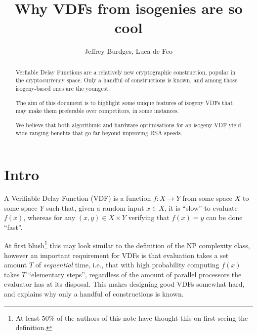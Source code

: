 \documentclass{article}
\title{Why VDFs from isogenies are so cool}
\author{Jeffrey Burdges, Luca de Feo}
\date{}
\begin{document}
\maketitle

\begin{abstract}
  Verfiable Delay Functions are a relatively new cryptographic
  construction, popular in the cryptocurrency space. Only a handful of
  constructions is known, and among those isogeny-based ones are the
  youngest.

  The aim of this document is to highlight some unique features of
  isogeny VDFs that may make them preferable over competitors, in some
  instances.

  We believe that both algorithmic and hardware optimisations for an
  isogeny VDF yield wide ranging benefits that go far beyond improving
  RSA speeds.
\end{abstract}


\section{Intro}

A Verifiable Delay Function (VDF) is a function $f: X → Y$ from some
space $X$ to some space $Y$ such that, given a random input $x ∈ X$,
it is ``slow'' to evaluate $f(x)$, whereas for any $(x,y) ∈ X×Y$
verifying that $f(x) = y$ can be done ``fast''.

At first blush\footnote{At least 50\% of the authors of this note have
  thought this on first seeing the definition.} this may look similar
to the definition of the NP complexity class, however an important
requirement for VDFs is that evaluation takes a set amount $T$ of
\emph{sequential} time, i.e., that with high probability computing
$f(x)$ takes $T$ ``elementary steps'', regardless of the amount of
parallel processors the evaluator has at its disposal.  This makes
designing good VDFs somewhat hard, and explains why only a handful of
constructions is known.
\end{document}
